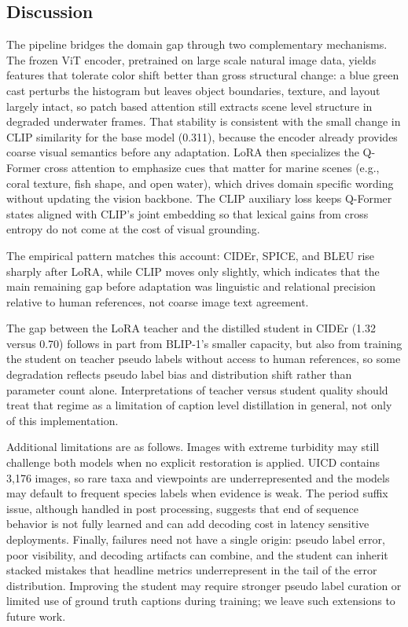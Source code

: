 \documentclass[journal]{IEEEtran}
\begin{document}
\subsection{Discussion}
The pipeline bridges the domain gap through two complementary mechanisms. The frozen ViT encoder, pretrained on large scale natural image data, yields features that tolerate color shift better than gross structural change: a blue green cast perturbs the histogram but leaves object boundaries, texture, and layout largely intact, so patch based attention still extracts scene level structure in degraded underwater frames. That stability is consistent with the small change in CLIP similarity for the base model (0.311), because the encoder already provides coarse visual semantics before any adaptation. LoRA then specializes the Q-Former cross attention to emphasize cues that matter for marine scenes (e.g., coral texture, fish shape, and open water), which drives domain specific wording without updating the vision backbone. The CLIP auxiliary loss keeps Q-Former states aligned with CLIP's joint embedding so that lexical gains from cross entropy do not come at the cost of visual grounding.

The empirical pattern matches this account: CIDEr, SPICE, and BLEU rise sharply after LoRA, while CLIP moves only slightly, which indicates that the main remaining gap before adaptation was linguistic and relational precision relative to human references, not coarse image text agreement.

The gap between the LoRA teacher and the distilled student in CIDEr (1.32 versus 0.70) follows in part from BLIP-1's smaller capacity, but also from training the student on teacher pseudo labels without access to human references, so some degradation reflects pseudo label bias and distribution shift rather than parameter count alone. Interpretations of teacher versus student quality should treat that regime as a limitation of caption level distillation in general, not only of this implementation.

Additional limitations are as follows. Images with extreme turbidity may still challenge both models when no explicit restoration is applied. UICD contains 3,176 images, so rare taxa and viewpoints are underrepresented and the models may default to frequent species labels when evidence is weak. The period suffix issue, although handled in post processing, suggests that end of sequence behavior is not fully learned and can add decoding cost in latency sensitive deployments. Finally, failures need not have a single origin: pseudo label error, poor visibility, and decoding artifacts can combine, and the student can inherit stacked mistakes that headline metrics underrepresent in the tail of the error distribution. Improving the student may require stronger pseudo label curation or limited use of ground truth captions during training; we leave such extensions to future work.
\end{document}
